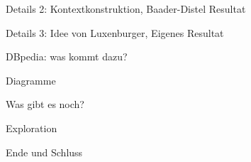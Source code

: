 \documentclass{beamer}
\begin{document}
\begin{frame}
  Details 2: Kontextkonstruktion, Baader-Distel Resultat
\end{frame}

\begin{frame}
  Details 3: Idee von Luxenburger, Eigenes Resultat
\end{frame}

\begin{frame}
  DBpedia: was kommt dazu?
\end{frame}

\begin{frame}
  Diagramme
\end{frame}

\begin{frame}
  Was gibt es noch?
\end{frame}

\begin{frame}
  Exploration
\end{frame}

\begin{frame}
  Ende und Schluss
\end{frame}
\end{document}
